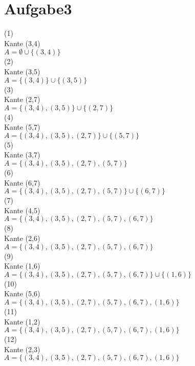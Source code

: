 \documentclass{article}
\begin{document}
\section*{Aufgabe3}
(1) \\
Kante (3,4) \\
$A = \emptyset \cup	\{(3,4)\}$\\ 
(2) \\
Kante (3,5) \\
$A = \{(3,4)\} \cup	\{(3,5)\}$\\ 
(3) \\
Kante (2,7) \\
$A = \{(3,4),(3,5)\} \cup	\{(2,7)\}$\\ 
(4) \\
Kante (5,7) \\
$A = \{(3,4),(3,5), (2,7)\} \cup	\{(5,7)\}$\\ 
(5) \\
Kante (3,7) \\
$A = \{(3,4),(3,5), (2,7), (5,7)\}$\\
(6) \\
Kante (6,7) \\
$A = \{(3,4),(3,5), (2,7), (5,7)\} \cup	\{(6,7)\}$\\ 
(7) \\
Kante (4,5) \\
$A = \{(3,4),(3,5), (2,7), (5,7), (6,7)\}$\\ 
(8) \\
Kante (2,6) \\
$A = \{(3,4),(3,5), (2,7), (5,7), (6,7)\}$\\ 
(9) \\
Kante (1,6) \\
$A = \{(3,4),(3,5), (2,7), (5,7), (6,7)\} \cup	\{(1,6)\}$\\ 
(10) \\
Kante (5,6) \\
$A = \{(3,4),(3,5), (2,7), (5,7), (6,7), (1,6)\}$\\ 
(11) \\
Kante (1,2) \\
$A = \{(3,4),(3,5), (2,7), (5,7), (6,7), (1,6)\}$\\ 
(12) \\
Kante (2,3) \\
$A = \{(3,4),(3,5), (2,7), (5,7), (6,7), (1,6)\}$\\ 
\end{document}
